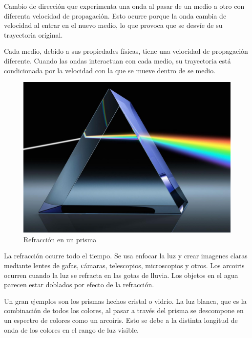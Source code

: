 Cambio de dirección que experimenta una onda al pasar de un medio a otro con diferenta velocidad de propagación. Esto ocurre porque la onda cambia de velocidad al entrar en el nuevo medio, lo que provoca que se desvíe de su trayectoria original.

Cada medio, debido a sus propiedades físicas, tiene una velocidad de propagación diferente. Cuando las ondas interactuan con cada medio, su trayectoria está condicionada por la velocidad con la que se mueve dentro de se medio.

\begin{figure}
  \centering
  \includegraphics[scale=0.5]{imagenes/prisma.png}
  \caption{Refracción en un prisma\cite{cstmglassprism}}
\end{figure}

La refracción ocurre todo el tiempo. Se usa enfocar la luz y crear imagenes claras mediante lentes de gafas, сámaras, telescopios, microscopios y otros. Los arcoiris ocurren cuando la luz se refracta en las gotas de lluvia. Los objetos en el agua parecen estar doblados por efecto de la refracción.

Un gran ejemplos son los prismas hechos cristal o vidrio. La luz blanca, que es la combinación de todos los colores, al pasar a través del prisma se descompone en un espectro de colores como un arcoiris. Esto se debe a la distinta longitud de onda de los colores en el rango de luz visible.
